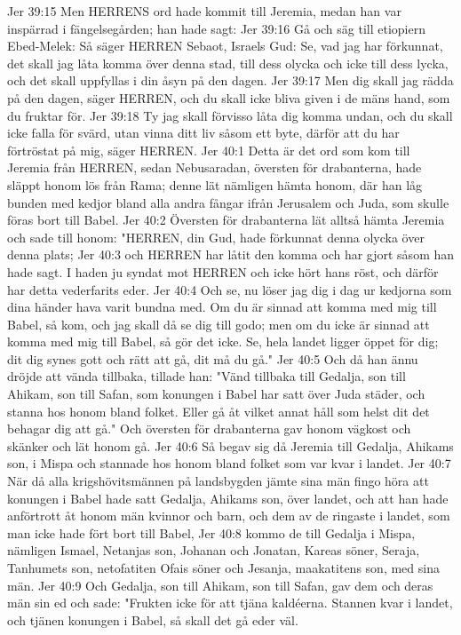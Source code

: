 Jer 39:15  Men HERRENS ord hade kommit till Jeremia, medan han var inspärrad i fängelsegården; han hade sagt:
Jer 39:16  Gå och säg till etiopiern Ebed-Melek: Så säger HERREN Sebaot, Israels Gud: Se, vad jag har förkunnat, det skall jag låta komma över denna stad, till dess olycka och icke till dess lycka, och det skall uppfyllas i din åsyn på den dagen.
Jer 39:17  Men dig skall jag rädda på den dagen, säger HERREN, och du skall icke bliva given i de mäns hand, som du fruktar för.
Jer 39:18  Ty jag skall förvisso låta dig komma undan, och du skall icke falla för svärd, utan vinna ditt liv såsom ett byte, därför att du har förtröstat på mig, säger HERREN.
Jer 40:1  Detta är det ord som kom till Jeremia från HERREN, sedan Nebusaradan, översten för drabanterna, hade släppt honom lös från Rama; denne lät nämligen hämta honom, där han låg bunden med kedjor bland alla andra fångar ifrån Jerusalem och Juda, som skulle föras bort till Babel.
Jer 40:2  Översten för drabanterna lät alltså hämta Jeremia och sade till honom: "HERREN, din Gud, hade förkunnat denna olycka över denna plats;
Jer 40:3  och HERREN har låtit den komma och har gjort såsom han hade sagt. I haden ju syndat mot HERREN och icke hört hans röst, och därför har detta vederfarits eder.
Jer 40:4  Och se, nu löser jag dig i dag ur kedjorna som dina händer hava varit bundna med. Om du är sinnad att komma med mig till Babel, så kom, och jag skall då se dig till godo; men om du icke är sinnad att komma med mig till Babel, så gör det icke. Se, hela landet ligger öppet för dig; dit dig synes gott och rätt att gå, dit må du gå."
Jer 40:5  Och då han ännu dröjde att vända tillbaka, tillade han: "Vänd tillbaka till Gedalja, son till Ahikam, son till Safan, som konungen i Babel har satt över Juda städer, och stanna hos honom bland folket. Eller gå åt vilket annat håll som helst dit det behagar dig att gå." Och översten för drabanterna gav honom vägkost och skänker och lät honom gå.
Jer 40:6  Så begav sig då Jeremia till Gedalja, Ahikams son, i Mispa och stannade hos honom bland folket som var kvar i landet.
Jer 40:7  När då alla krigshövitsmännen på landsbygden jämte sina män fingo höra att konungen i Babel hade satt Gedalja, Ahikams son, över landet, och att han hade anförtrott åt honom män kvinnor och barn, och dem av de ringaste i landet, som man icke hade fört bort till Babel,
Jer 40:8  kommo de till Gedalja i Mispa, nämligen Ismael, Netanjas son, Johanan och Jonatan, Kareas söner, Seraja, Tanhumets son, netofatiten Ofais söner och Jesanja, maakatitens son, med sina män.
Jer 40:9  Och Gedalja, son till Ahikam, son till Safan, gav dem och deras män sin ed och sade: "Frukten icke för att tjäna kaldéerna. Stannen kvar i landet, och tjänen konungen i Babel, så skall det gå eder väl.
